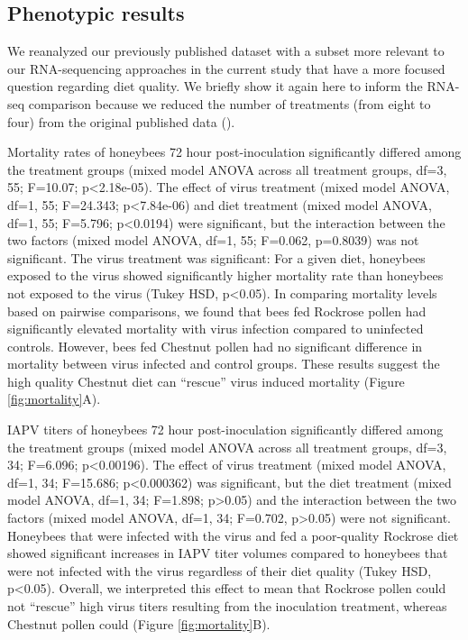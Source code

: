 \documentclass[11pt,a4paper,oldfontcommands,openany]{memoir}
\numberwithin{equation}{section} %
\begin{document}
\subsection{Phenotypic results}

We reanalyzed our previously published dataset with a subset more relevant to our RNA-sequencing approaches in the current study that have a more focused question regarding diet quality. We briefly show it again here to inform the RNA-seq comparison because we reduced the number of treatments (from eight to four) from the original published data (\citealt{adamInt}).

Mortality rates of honeybees 72 hour post-inoculation significantly differed among the treatment groups (mixed model ANOVA across all treatment groups, df=3, 55; F=10.07; p<2.18e-05). The effect of virus treatment (mixed model ANOVA, df=1, 55; F=24.343; p<7.84e-06) and diet treatment (mixed model ANOVA, df=1, 55; F=5.796; p<0.0194) were significant, but the interaction between the two factors (mixed model ANOVA, df=1, 55; F=0.062, p=0.8039) was not significant. The virus treatment was significant: For a given diet, honeybees exposed to the virus showed significantly higher mortality rate than honeybees not exposed to the virus (Tukey HSD, p<0.05). In comparing mortality levels based on pairwise comparisons, we found that bees fed Rockrose pollen had significantly elevated mortality with virus infection compared to uninfected controls. However, bees fed Chestnut pollen had no significant difference in mortality between virus infected and control groups. These results suggest the high quality Chestnut diet can ``rescue'' virus induced mortality (Figure \ref{fig:mortality}A).

IAPV titers of honeybees 72 hour post-inoculation significantly differed among the treatment groups (mixed model ANOVA across all treatment groups, df=3, 34; F=6.096; p<0.00196). The effect of virus treatment (mixed model ANOVA, df=1, 34; F=15.686; p<0.000362) was significant, but the diet treatment (mixed model ANOVA, df=1, 34; F=1.898; p>0.05) and the interaction between the two factors (mixed model ANOVA, df=1, 34; F=0.702, p>0.05) were not significant. Honeybees that were infected with the virus and fed a poor-quality Rockrose diet showed significant increases in IAPV titer volumes compared to honeybees that were not infected with the virus regardless of their diet quality (Tukey HSD, p<0.05). Overall, we interpreted this effect to mean that Rockrose pollen could not ``rescue'' high virus titers resulting from the inoculation treatment, whereas Chestnut pollen could (Figure \ref{fig:mortality}B).
\end{document}

